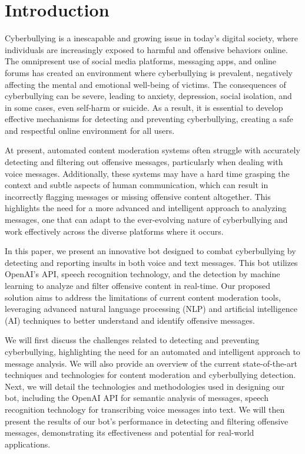 \documentclass[conference]{IEEEtran}
\begin{document}
\section{Introduction}
Cyberbullying is a inescapable and growing issue in today's digital society, where individuals are increasingly exposed to harmful and offensive behaviors online. The omnipresent use of social media platforms, messaging apps, and online forums has created an environment where cyberbullying is prevalent, negatively affecting the mental and emotional well-being of victims. The consequences of cyberbullying can be severe, leading to anxiety, depression, social isolation, and in some cases, even self-harm or suicide. As a result, it is essential to develop effective mechanisms for detecting and preventing cyberbullying, creating a safe and respectful online environment for all users.

At present, automated content moderation systems often struggle with accurately detecting and filtering out offensive messages, particularly when dealing with voice messages. Additionally, these systems may have a hard time grasping the context and subtle aspects of human communication, which can result in incorrectly flagging messages or missing offensive content altogether. This highlights the need for a more advanced and intelligent approach to analyzing messages, one that can adapt to the ever-evolving nature of cyberbullying and work effectively across the diverse platforms where it occurs.

In this paper, we present an innovative bot designed to combat cyberbullying by detecting and reporting insults in both voice and text messages. This bot utilizes OpenAI's API, speech recognition technology, and the detection by machine learning to analyze and filter offensive content in real-time. Our proposed solution aims to address the limitations of current content moderation tools, leveraging advanced natural language processing (NLP) and artificial intelligence (AI) techniques to better understand and identify offensive messages.

We will first discuss the challenges related to detecting and preventing cyberbullying, highlighting the need for an automated and intelligent approach to message analysis. We will also provide an overview of the current state-of-the-art techniques and technologies for content moderation and cyberbullying detection. Next, we will detail the technologies and methodologies used in designing our bot, including the OpenAI API for semantic analysis of messages, speech recognition technology for transcribing voice messages into text. We will then present the results of our bot's performance in detecting and filtering offensive messages, demonstrating its effectiveness and potential for real-world applications.
\end{document}
